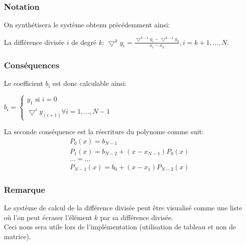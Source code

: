 \subsubsection{Notation}
On synthétisera le système obtenu précédemment ainsi: \\
\begin{center}
La différence divisée $i$ de degré $k$: $\bigtriangledown^{k}y_i = \frac{\bigtriangledown^{k-1}y_i -\bigtriangledown^{k-1}y_k}{x_i - x_k}, i= k+1, \ldots, N.  $
\end{center}
\subsubsection{Conséquences}
Le coefficient $b_i$ est donc calculable ainsi:
\begin{center}
$b_i =
\begin{cases}
y_1 \text{ si } i=0  \\
\bigtriangledown^{i}y_{(i+1)} \forall i = 1,\ldots, N-1
\end{cases}
$
\end{center}
La seconde conséquence est la réecriture du polynome comme suit:\\
\begin{align*}
&P_0(x) = b_{N-1} \\
&P_1(x) = b_{N-2} + (x-x_{N-1})P_0(x) \\
&\ldots = \ldots \\
&P_{N-1}(x) = b_0 + (x-x_1)P_{N-2}(x)
\end{align*}
\subsubsection{Remarque}
Le système de calcul de la différence divisée peut être visualisé comme une liste où l'on peut écraser l'élément $k$ par sa différence divisée.\\
Ceci nous sera utile lors de l'implémentation (utilisation de tableau et non de matrice).
